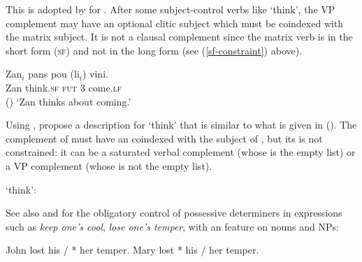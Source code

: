 This is adopted by \citet{HenriandLaurens2011}\addpages for .  After some
subject-control verbs like  `think', the VP complement may have an optional clitic
subject which must be coindexed with the matrix subject.  It is not a clausal complement since the
matrix verb is in the short form (\textsc{sf}) and not in the long form (see (\ref{sf-constraint})
above).

\ea
\gll Zan$_{i}$ pans              pou           (li$_{i}$)            vini.\footnotemark\\
     Zan       think.\textsc{sf} \textsc{fut} \hphantom{(}3\SG{} come.\textsc{lf}  \\\hfill()
\glt `Zan thinks about coming.'
\z

\noindent
Using \xarg, \citet[]{HenriandLaurens2011} propose a description for  `think' that is
similar to what is given in (). The complement of
 must have an \xarg coindexed with the subject of , but its \subjl is not
constrained: it can be a saturated verbal complement (whose \subjv is the empty list) or a VP
complement (whose \subjv is not the empty list).

\ea
\label{ex-pans-Maritian}
 `think':\\
\z

\noindent
See also  and  for the obligatory control of possessive determiners in  expressions such as \emph{keep one's cool}, \emph{lose one's temper}, with an \xarg feature on nouns and NPs:
\begin{exe}
\ex \begin{xlist}
\ex John lost his / * her temper.
\ex Mary lost * his / her temper.
\end{xlist}
\end{exe}

